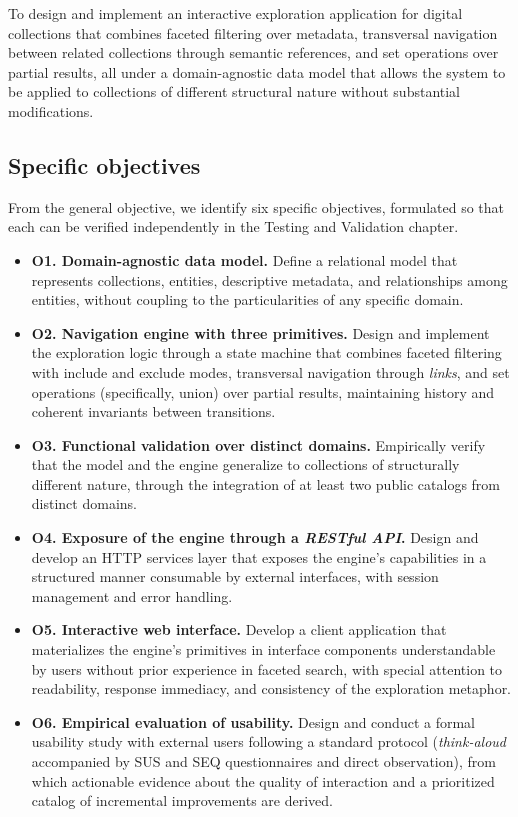 To design and implement an interactive exploration application for digital collections that
combines faceted filtering over metadata, transversal navigation between related collections
through semantic references, and set operations over partial results, all under a
domain-agnostic data model that allows the system to be applied to collections of different
structural nature without substantial modifications.

\subsection*{Specific objectives}

From the general objective, we identify six specific objectives, formulated so that each can be
verified independently in the Testing and Validation chapter.

\begin{itemize}
\item \textbf{O1. Domain-agnostic data model.} Define a relational model that represents
collections, entities, descriptive metadata, and relationships among entities, without coupling
to the particularities of any specific domain.

\item \textbf{O2. Navigation engine with three primitives.} Design and implement the
exploration logic through a state machine that combines faceted filtering with include and
exclude modes, transversal navigation through \textit{links}, and set operations (specifically,
union) over partial results, maintaining history and coherent invariants between transitions.

\item \textbf{O3. Functional validation over distinct domains.} Empirically verify that the
model and the engine generalize to collections of structurally different nature, through the
integration of at least two public catalogs from distinct domains.

\item \textbf{O4. Exposure of the engine through a \textit{RESTful API}.} Design and develop
an HTTP services layer that exposes the engine's capabilities in a structured manner consumable
by external interfaces, with session management and error handling.

\item \textbf{O5. Interactive web interface.} Develop a client application that materializes
the engine's primitives in interface components understandable by users without prior
experience in faceted search, with special attention to readability, response immediacy, and
consistency of the exploration metaphor.

\item \textbf{O6. Empirical evaluation of usability.} Design and conduct a formal usability
study with external users following a standard protocol (\textit{think-aloud} accompanied by
SUS and SEQ questionnaires and direct observation), from which actionable evidence about the
quality of interaction and a prioritized catalog of incremental improvements are derived.
\end{itemize}

